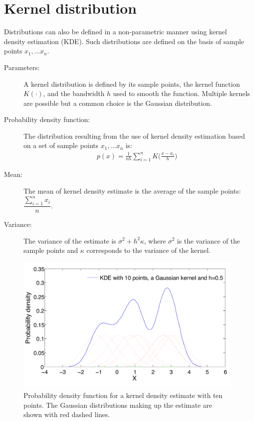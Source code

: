 \section*{Kernel distribution}

Distributions can also be defined in a non-parametric manner using kernel density estimation (KDE).  Such distributions are defined on the basis of sample points $x_1,...x_n$.

\begin{description}
\item [Parameters: ] A kernel distribution is defined by its sample points, the kernel function $K(\cdot)$, and the bandwidth $h$ used to smooth the function.  Multiple kernels are possible but a common choice is the Gaussian distribution.

\item [Probability density function: ] The distribution resulting from the use of kernel density estimation based on a set of sample points $x_1,...x_n$ is: 
\begin{align}
p(x) = \frac{1}{nh} \sum_{i=1}^n K\Big(\frac{x-x_i}{h}\Big)
\end{align}
\item [Mean: ] The mean of kernel density estimate is the average of the sample points: $\dfrac{\sum_{i=1}^n x_i}{n}$.

\item [Variance: ] The variance of the estimate is $\sigma^2 + h^2 \kappa$, where $\sigma^2$ is the variance of the sample points and $\kappa$ corresponds to the variance of the kernel. 

\end{description}

\newpage 

\begin{figure}[t]
\centering
\includegraphics[scale=0.40]{imgs/kde_appendix.pdf}
\caption{Probability density function for a kernel density estimate with ten points. The Gaussian distributions making up the estimate are shown with red dashed lines. } 
\label{fig:norm-appendix}
\end{figure}

$\phantom{aa}$
